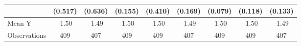 {\begin{tabular}{l*{8}{c}}
            &     (0.517)         &     (0.636)         &     (0.155)         &     (0.410)         &     (0.169)         &     (0.079)         &     (0.118)         &     (0.133)         \\
\midrule
Mean Y      &       -1.50         &       -1.49         &       -1.50         &       -1.50         &       -1.49         &       -1.50         &       -1.50         &       -1.49         \\
Observations&         409         &         407         &         409         &         409         &         407         &         409         &         409         &         407         \\
\bottomrule
\end{tabular}
}
